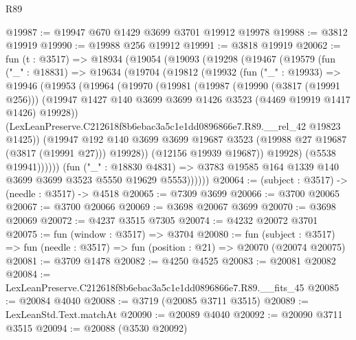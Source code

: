 \begin{lexlean}{R89}
\begin{coremodule}
@19987 := @19947 @670 @1429 @3699 @3701 @19912 @19978
@19988 := @3812 @19919
@19990 := @19988 @256 @19912
@19991 := @3818 @19919
@20062 := fun (t : @3517) =>
  @18934
    (@19054
      (@19093
        (@19298
          (@19467
            (@19579
              (fun ("_" : @18831) =>
              @19634
                (@19704
                  (@19812
                    (@19932
                      (fun ("_" : @19933) =>
                      @19946
                        (@19953
                          (@19964
                            (@19970
                              (@19981
                                (@19987
                                  (@19990 (@3817 (@19991 @256)))
                                  (@19947
                                    @1427
                                    @140
                                    @3699
                                    @3699
                                    @1426
                                    @3523
                                    (@4469 @19919 @1417 @1426)
                                    @19928))
                                (LexLeanPreserve.C212618f8b6ebac3a5c1e1dd0896866e7.R89.__rel_42
                                  @19823
                                  @1425))
                              (@19947
                                @192
                                @140
                                @3699
                                @3699
                                @19687
                                @3523
                                (@19988 @27 @19687 (@3817 (@19991 @27)))
                                @19928))
                            (@12156 @19939 @19687))
                          @19928)
                        (@5538 @19941))))))
              (fun ("_" : @18830 @4831) =>
              @3783 @19585 @164 @1339 @140 @3699 @3699 @3523 @5550 @19629 @5553))))))
@20064 := (subject : @3517) -> (needle : @3517) -> @4518
@20065 := @7309 @3699
@20066 := @3700 @20065
@20067 := @3700 @20066
@20069 := @3698 @20067 @3699
@20070 := @3698 @20069
@20072 := @4237 @3515 @7305
@20074 := @4232 @20072 @3701
@20075 := fun (window : @3517) => @3704
@20080 := fun (subject : @3517) =>
  fun (needle : @3517) => fun (position : @21) => @20070 (@20074 @20075)
@20081 := @3709 @1478
@20082 := @4250 @4525
@20083 := @20081 @20082
@20084 := LexLeanPreserve.C212618f8b6ebac3a5c1e1dd0896866e7.R89.__fits_45
@20085 := @20084 @4040
@20088 := @3719 (@20085 @3711 @3515)
@20089 := LexLeanStd.Text.matchAt
@20090 := @20089 @4040
@20092 := @20090 @3711 @3515
@20094 := @20088 (@3530 @20092)

\end{coremodule}
\end{lexlean}
